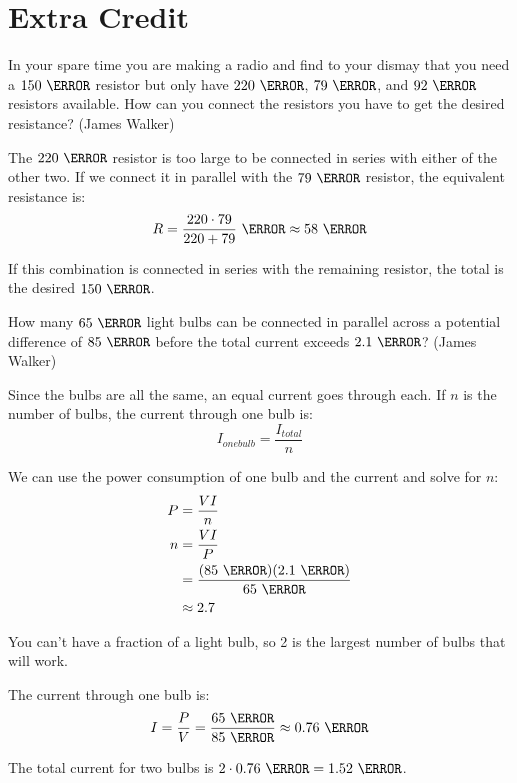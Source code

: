 \documentclass{exam}
\begin{document}
\section{Extra Credit}
\begin{questions}

\question
In your spare time you are making a radio and find to your dismay that you need a $150 \ \ohm$ resistor but only have
$220 \ \ohm$, $79 \ \ohm$, and $92 \ \ohm$ resistors available.  How can you connect the resistors you have to get the
desired resistance? (James Walker)

\begin{solution}
The $220 \ \ohm$ resistor is too large to be connected in series with either of the other two.  If we connect it in
parallel with the  $79 \ \ohm$ resistor, the equivalent resistance is:
\[
  R = \frac{220 \cdot 79}{220 + 79} \ \ohm \approx 58 \ \ohm
\]

If this combination is connected in series with the remaining resistor, the total is the desired $150 \ \ohm$.

\end{solution}

\question How many $65 \ \watt$ light bulbs can be connected in parallel across a potential difference of $85 \ \volt$
before the total current exceeds $2.1 \ \ampere$? (James Walker)

\begin{solution}
Since the bulbs are all the same, an equal current goes through each.  If $n$ is the number of bulbs, the current through one bulb is:
\[
  I_{one bulb} = \frac{I_{total}}{n}
\]

We can use the power consumption of one bulb and the current and solve for $n$:
\begin{align*}
  P &= \frac{VI}{n} \\
  n &= \frac{VI}{P} \\
    &= \frac{(85 \ \volt)(2.1 \ \ampere)}{65 \ \watt} \\
    &\approx 2.7 \\
\end{align*}

You can't have a fraction of a light bulb, so 2 is the largest number of bulbs that will work.

The current through one bulb is:
\[
  I = \frac{P}{V} = \frac{65 \ \watt}{85 \ \volt} \approx 0.76 \ \ampere
\]

The total current for two bulbs is $2 \cdot 0.76 \ \ampere = 1.52 \ \ampere$.  

\end{solution}

\end{questions}
\end{document}
